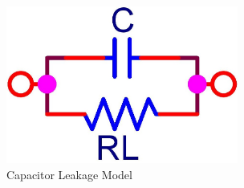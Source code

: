 \begin{figure}[ht!]
\includegraphics[keepaspectratio=true,width=3in]{./figures/parameters/leakage.jpg}
\centering
\caption{Capacitor Leakage Model}
\label{fig:leakage}
\end{figure}
